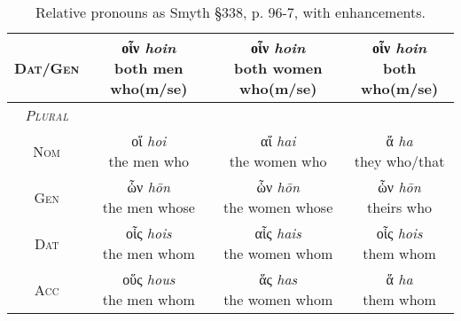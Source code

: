 \documentclass[10pt]{memoir}
\newcommand{\tsc}[1]{\textsc{#1}}
\newcommand{\grc}[1]{\fontspec{Inter}#1}
\newcommand{\trc}[1]{\textit{\fontspec{Tinos}#1}}
\begin{document}
\begin{table}[H]
\begin{tabular}{c|ccc}
            \tsc{Dat/Gen} & \makecell{\grc{οἷν} \trc{hoin} \\ \small both men who(m/se)} & \makecell{\grc{οἷν} \trc{hoin} \\ \small both women who(m/se)} & \makecell{\grc{οἷν} \trc{hoin} \\ \small both who(m/se)} \\
            \hline
            \emph{\tsc{Plural}} \\
            \tsc{Nom} & \makecell{\grc{οἵ} \trc{hoi} \\ \small the men who} & \makecell{\grc{αἵ} \trc{hai} \\ \small the women who} & \makecell{\grc{ἅ} \trc{ha} \\ \small they who/that} \\
            \tsc{Gen} & \makecell{\grc{ὧν} \trc{hōn} \\ \small the men whose} & \makecell{\grc{ὧν} \trc{hōn} \\ \small the women whose} & \makecell{\grc{ὧν} \trc{hōn} \\ \small theirs who} \\
            \tsc{Dat} & \makecell{\grc{οἷς} \trc{hois} \\ \small the men whom} & \makecell{\grc{αἷς} \trc{hais}\\ \small the women whom} & \makecell{\grc{οἷς} \trc{hois} \\ \small them whom} \\
            \tsc{Acc} & \makecell{\grc{οὕς} \trc{hous} \\ \small the men whom} & \makecell{\grc{ἅς} \trc{has} \\ \small the women whom} & \makecell{\grc{ἅ} \trc{ha} \\ \small them whom} \\
        \end{tabular}
        \caption{Relative pronouns as Smyth §338, p. 96-7, with enhancements.}
    \end{table}
\end{document}
